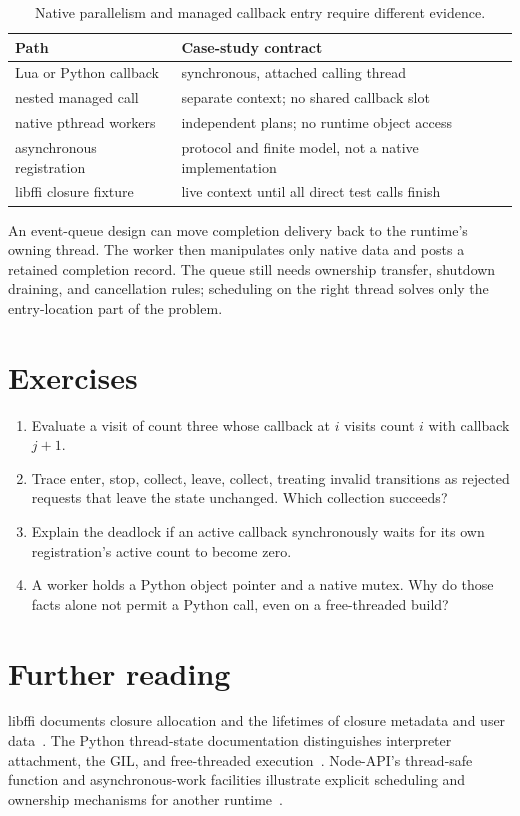 \begin{table}[htbp]
\caption{Native parallelism and managed callback entry require different evidence.}
\label{tab:ch73-execution}
\centering
\begin{tabular}{ll}
\toprule
Path & Case-study contract \\
\midrule
Lua or Python callback & synchronous, attached calling thread \\
nested managed call & separate context; no shared callback slot \\
native pthread workers & independent plans; no runtime object access \\
asynchronous registration & protocol and finite model, not a native implementation \\
libffi closure fixture & live context until all direct test calls finish \\
\bottomrule
\end{tabular}
\end{table}

An event-queue design can move completion delivery back to the runtime's owning thread.
The worker then manipulates only native data and posts a retained completion record.
The queue still needs ownership transfer, shutdown draining, and cancellation rules; scheduling on the right thread solves only the entry-location part of the problem.

\section{Exercises}
\label{sec:ch73-exercises}
\begin{enumerate}
\item\label{ex:ch73-nested} Evaluate a visit of count three whose callback at $i$ visits count $i$ with callback $j+1$.
\item\label{ex:ch73-stop} Trace enter, stop, collect, leave, collect, treating invalid transitions as rejected requests that leave the state unchanged.
Which collection succeeds?
\item\label{ex:ch73-self} Explain the deadlock if an active callback synchronously waits for its own registration's active count to become zero.
\item\label{ex:ch73-thread} A worker holds a Python object pointer and a native mutex.
Why do those facts alone not permit a Python call, even on a free-threaded build?
\end{enumerate}

\section{Further reading}
\label{sec:ch73-reading}
libffi documents closure allocation and the lifetimes of closure metadata and user data~\cite{libffi-2026-manual}.
The Python thread-state documentation distinguishes interpreter attachment, the GIL, and free-threaded execution~\cite{python-2026-capi}.
Node-API's thread-safe function and asynchronous-work facilities illustrate explicit scheduling and ownership mechanisms for another runtime~\cite{node-2026-api}.
